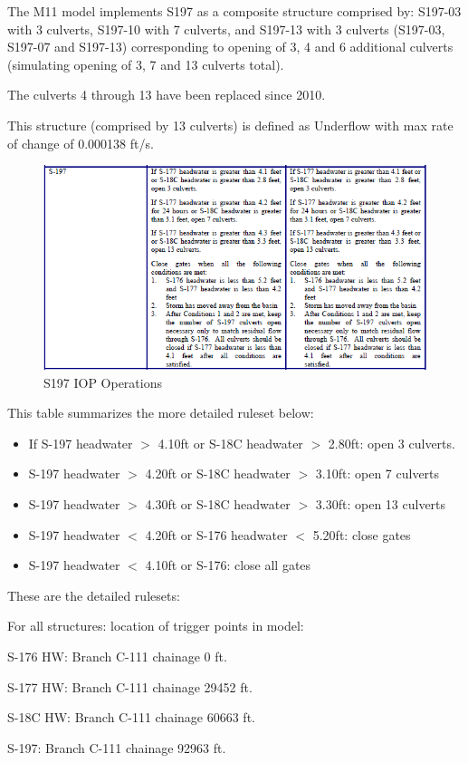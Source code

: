 The M11 model implements S197 as a composite structure comprised by: S197-03 with 3 culverts, S197-10 with 7 culverts, and S197-13 with 3 culverts (S197-03, S197-07 and S197-13) corresponding to opening of 3, 4 and 6 additional culverts (simulating opening of 3, 7 and 13 culverts total).

The culverts 4 through 13 have been replaced since 2010.

This structure (comprised by 13 culverts) is defined as Underflow with max rate of change of 0.000138 ft/s.

\begin{figure}[!h]
  \begin{center}
  \includegraphics[width=6.5in]{../figs/S197_IOPops.png}
  \caption{S197 IOP Operations}
  \label{fig:S197iop}
  \end{center}
\end{figure}

This table summarizes the more detailed ruleset below:
\begin{itemize}
\item If S-197 headwater $>$ 4.10ft or S-18C headwater $>$ 2.80ft: open 3 culverts.
\item S-197 headwater $>$ 4.20ft or S-18C headwater $>$ 3.10ft: open 7 culverts
\item S-197 headwater $>$ 4.30ft or S-18C headwater $>$ 3.30ft: open 13 culverts
\item S-197 headwater $<$ 4.20ft or S-176 headwater $<$ 5.20ft: close gates
\item S-197 headwater $<$ 4.10ft or S-176: close all gates
\end{itemize}

These are the detailed rulesets:

For all structures: location of trigger points in model:
\begin{packed_items}
\item S-176 HW: Branch C-111 chainage 0 ft.
\item S-177 HW: Branch C-111 chainage 29452 ft.
\item S-18C HW: Branch C-111 chainage 60663 ft.
\item S-197: Branch C-111 chainage 92963 ft.
\end{packed_items}




